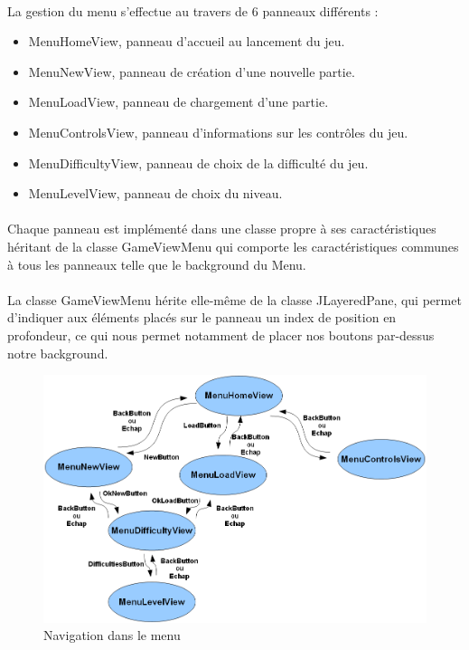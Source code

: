 \documentclass[a4paper,12pt]{report}
\begin{document}
\paragraph{}La gestion du menu s’effectue au travers de 6 panneaux différents : 
\begin{itemize}
\item MenuHomeView, panneau d’accueil au lancement du jeu.
\item MenuNewView, panneau de création d’une nouvelle partie.
\item MenuLoadView, panneau de chargement d’une partie.
\item MenuControlsView, panneau d’informations sur les contrôles du jeu.
\item MenuDifficultyView, panneau de choix de la difficulté du jeu.
\item MenuLevelView, panneau de choix du niveau.
\end{itemize}

\paragraph{}Chaque panneau est implémenté dans une classe propre à ses caractéristiques héritant de la classe GameViewMenu qui comporte les caractéristiques communes à tous les panneaux telle que le background du Menu.

\paragraph{}La classe GameViewMenu hérite elle-même de la classe JLayeredPane, qui permet d’indiquer aux éléments placés sur le panneau un index de position en profondeur, ce qui nous permet notamment de placer nos boutons par-dessus notre background.

\begin{figure}[H]
\begin{center}
\includegraphics[scale=0.5]{images/navigationmenu.png} 
\end{center}
\caption{Navigation dans le menu}
\label{Navigation dans le menu}
\end{figure}
\end{document}
